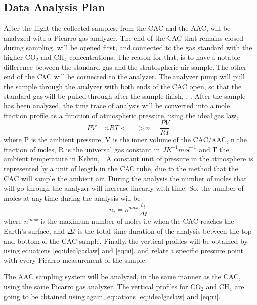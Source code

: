 \subsection{Data Analysis Plan}

After the flight the collected samples, from the CAC and the AAC, will be analyzed with a Picarro gas analyzer. The end of the CAC that remains closed during sampling, will be opened first, and connected to the gas standard with the higher CO$_2$ and CH$_4$ concentrations. The reason for that, is to have a notable difference between the standard gas and the stratospheric air sample. The other end of the CAC will be connected to the analyzer. The analyzer pump will pull the sample through the analyzer with both ends of the CAC open, so that the standard gas will be pulled through after the sample finish, \cite{Karion}, \cite{Olivier}.
After the sample has been analyzed, the time trace of analysis will be converted into a mole fraction profile as a function of atmospheric pressure, using the ideal gas law,
\begin{equation}
    PV = nRT <=> n = \frac{PV}{RT}
    \label{eq:idealgaslaw}
\end{equation}
where P is the ambient pressure, V is the inner volume of the CAC/AAC, n the fraction of moles, R is the universal gas constant in $J K^{-1} mol^{-1}$ and T the ambient temperature in Kelvin, \cite{Olivier}. 
A constant unit of pressure in the atmosphere is represented by a unit of length in the CAC tube, due to the method that the CAC will sample the ambient air.
During the analysis the number of moles that will go through the analyzer will increase linearly with time. So, the number of moles at any time during the analysis will be
\begin{equation}
    n_i = n^{max}\frac{t_i}{\Delta t}
    \label{eq:ni}
\end{equation}
where $n^{max}$ is the maximum number of moles i.e when the CAC reaches the Earth's surface, and $\Delta t$  is the total time duration of the analysis between the top and bottom of the CAC sample.   
Finally, the vertical profiles will be obtained by using equations \ref{eq:idealgaslaw} and \ref{eq:ni}, and relate a specific pressure point with every Picarro measurement of the sample.   

The AAC sampling system will be analyzed, in the same manner as the CAC, using the same Picarro gas analyzer. The vertical profiles for CO$_2$ and CH$_4$ are going to be obtained using again, equations \ref{eq:idealgaslaw} and \ref{eq:ni}. 


 